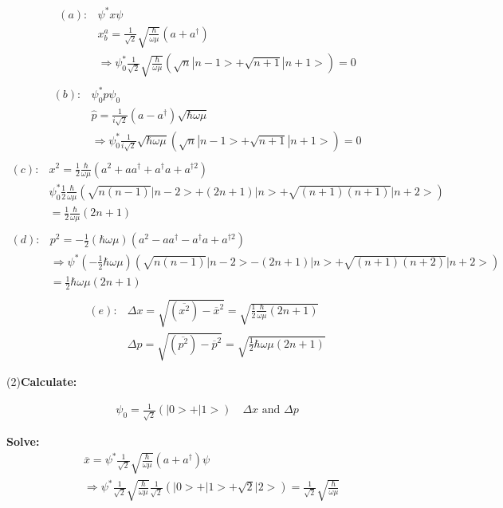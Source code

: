 \documentclass{article}
\begin{document}
  \begin{align*}
  (a):&\psi^*x\psi\\
  &x^a_b=\frac1{\sqrt{2}}\sqrt{\frac{\hbar}{\omega \mu}}(a+a^{\dagger})\\
  &\Rightarrow \psi^*_0\frac1{\sqrt{2}}\sqrt{\frac{\hbar}{\omega \mu}}(\sqrt{n}|n-1>+\sqrt{n+1}|n+1>)=0 \\
  \end{align*}
  \begin{align*}
    (b):&\psi_0^*p\psi_0\\
        &\hat p=\frac1{i\sqrt{2}}(a-a^{\dagger})\sqrt{\hbar \omega \mu}\\
        &\Rightarrow \psi_0^*\frac1{i\sqrt{2}}\sqrt{\hbar \omega \mu}(\sqrt{n}|n-1>+\sqrt{n+1}|n+1>)=0\\
  \end{align*}
  \begin{align*}
  (c):&x^2=\frac12\frac{\hbar}{\omega\mu}(a^2+aa^{\dagger}+a^{\dagger}a+a^{\dagger2}) \\
      &\psi^*_0\frac12\frac{\hbar}{\omega\mu}(\sqrt{n(n-1)}|n-2>+(2n+1)|n>+\sqrt{(n+1)(n+1)}|n+2>)\\
      &=\frac12\frac{\hbar}{\omega\mu}(2n+1) \\
  \end{align*}
  \begin{align*}
    (d):&p^2=-\frac12(\hbar\omega\mu)(a^2-aa^{\dagger}-a^{\dagger}a+a^{\dagger2})\\
        &\Rightarrow \psi^*(-\frac12\hbar\omega\mu)(\sqrt{n(n-1)}|n-2>-(2n+1)|n>+\sqrt{(n+1)(n+2)}|n+2>) \\
        &=\frac12\hbar\omega\mu(2n+1) \\
  \end{align*}
  \begin{align*}
    (e):&\Delta x=\sqrt{(\overline{x^2})-\overline{x}^2}=\sqrt{\frac12\frac{\hbar}{\omega\mu}(2n+1)}\\
        &\Delta p=\sqrt{(\overline{p^2})-\overline{p}^2}=\sqrt{\frac12\hbar\omega\mu(2n+1)}
  \end{align*}

  (2)\textbf{Calculate:}
  
  \begin{align*}
    \psi_0=\frac1{\sqrt{2}}(|0>+|1>)\quad\Delta x\text{ and }\Delta p
  \end{align*}

  \textbf{Solve:}
  \begin{align*}
    &\overline {x}=\psi^*\frac1{\sqrt{2}}\sqrt{\frac{\hbar}{\omega\mu}}(a+a^{\dagger}) \psi\\
    &\Rightarrow \psi^*\frac1{\sqrt{2}}\sqrt{\frac{\hbar}{\omega\mu}}\frac1{\sqrt{2}}(|0>+|1>+\sqrt{2}|2>)=\frac1{\sqrt{2}}\sqrt{\frac{\hbar}{\omega\mu}} \\
  \end{align*}
\end{document}
